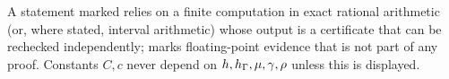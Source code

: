 A statement marked  relies on a finite computation in exact rational arithmetic (or, where stated, interval arithmetic) whose output is a certificate that can be rechecked independently;  marks floating-point evidence that is not part of any proof. Constants $C,c$ never depend on $h,h_\Gamma,\mu,\gamma,\rho$ unless this is displayed.
